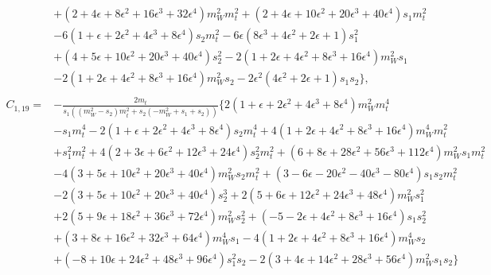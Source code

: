 \documentclass[twocolumn,aps,showpacs,nofootinbib,superscriptaddress,prd]{revtex4-2}
\begin{document}
\begin{widetext}
\begin{align}
\nonumber\\&
+\left(2 +4 \epsilon +8 \epsilon^2 +16 \epsilon^3 +32 \epsilon^4\right)m_W^2m_t^2+\left(2 +4 \epsilon +10 \epsilon^2 +20 \epsilon^3 +40 \epsilon^4\right)s_1m_t^2
\nonumber\\&
-6\left(1 +\epsilon +2 \epsilon^2 +4 \epsilon^3 +8 \epsilon^4\right)s_2m_t^2-6\epsilon\left(8\epsilon^3+4\epsilon^2+2\epsilon+1\right)s_1^2
\nonumber\\&
+\left(4 +5 \epsilon +10 \epsilon^2 +20 \epsilon^3 +40 \epsilon^4\right)s_2^2-2\left(1 +2 \epsilon +4 \epsilon^2 +8 \epsilon^3 +16 \epsilon^4\right)m_W^2s_1
\nonumber\\&
-2\left(1 +2 \epsilon +4 \epsilon^2 +8 \epsilon^3 +16 \epsilon^4\right)m_W^2s_2-2\epsilon^2\left(4\epsilon^2+2\epsilon+1\right)s_1s_2\}
,\nonumber\\
\nonumber\\
C_{1,19}=&-\frac{2m_t}{s_1\left(\left(m_W^2-s_2\right)m_t^2+s_2\left(-m_W^2+s_1+s_2\right)\right)}\{2\left(1 +\epsilon +2 \epsilon^2 +4 \epsilon^3 +8 \epsilon^4\right)m_W^2m_t^4
\nonumber\\&
-s_1m_t^4-2\left(1 +\epsilon +2 \epsilon^2 +4 \epsilon^3 +8 \epsilon^4\right)s_2m_t^4+4\left(1 +2 \epsilon +4 \epsilon^2 +8 \epsilon^3 +16 \epsilon^4\right)m_W^4m_t^2
\nonumber\\&
+s_1^2m_t^2+4\left(2 +3 \epsilon +6 \epsilon^2 +12 \epsilon^3 +24 \epsilon^4\right)s_2^2m_t^2+\left(6 +8 \epsilon +28 \epsilon^2 +56 \epsilon^3 +112 \epsilon^4\right)m_W^2s_1m_t^2
\nonumber\\&
-4\left(3 +5 \epsilon +10 \epsilon^2 +20 \epsilon^3 +40 \epsilon^4\right)m_W^2s_2m_t^2+\left(3 -6 \epsilon -20 \epsilon^2 -40 \epsilon^3 -80 \epsilon^4\right)s_1s_2m_t^2
\nonumber\\&
-2\left(3 +5 \epsilon +10 \epsilon^2 +20 \epsilon^3 +40 \epsilon^4\right)s_2^3+2\left(5 +6 \epsilon +12 \epsilon^2 +24 \epsilon^3 +48 \epsilon^4\right)m_W^2s_1^2
\nonumber\\&
+2\left(5 +9 \epsilon +18 \epsilon^2 +36 \epsilon^3 +72 \epsilon^4\right)m_W^2s_2^2+\left(-5 -2 \epsilon +4 \epsilon^2 +8 \epsilon^3 +16 \epsilon^4\right)s_1s_2^2
\nonumber\\&
+\left(3 +8 \epsilon +16 \epsilon^2 +32 \epsilon^3 +64 \epsilon^4\right)m_W^4s_1-4\left(1 +2 \epsilon +4 \epsilon^2 +8 \epsilon^3 +16 \epsilon^4\right)m_W^4s_2
\nonumber\\&
+\left(-8 +10 \epsilon +24 \epsilon^2 +48 \epsilon^3 +96 \epsilon^4\right)s_1^2s_2-2\left(3 +4 \epsilon +14 \epsilon^2 +28 \epsilon^3 +56 \epsilon^4\right)m_W^2s_1s_2\}

\end{align}
\end{widetext}
\end{document}
